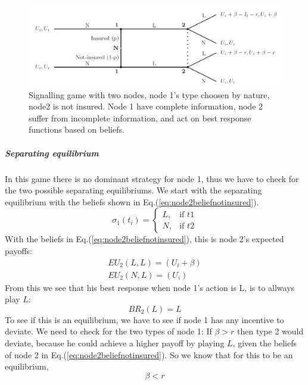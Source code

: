\begin{figure}[h]
\centering

  \centering
\includegraphics[width=1\linewidth]{../Figures/SignalingGameNotInsured.png}

\caption{Signalling game with two nodes, node 1's type choosen by nature, node2 is not insured. Node 1 have complete information, node 2 suffer from incomplete information, and act on best response functions based on beliefs. \label{fig:signalingNotInsured}}

\end{figure}
\subparagraph{Separating equilibrium}
In this game there is no dominant strategy for node 1, thus we have to check for the two possible separating equilibriums.
We start with the separating equilibrium with the beliefs shown in Eq.(\ref{eq:node2beliefnotinsured}).
\begin{equation}
    \sigma_{1}(t_{i})= 
\begin{cases}
   L,& \text{if } t1\\
   N,& \text{if } t2  
\end{cases}
\label{eq:node2beliefnotinsured}
\end{equation}
With the beliefs in Eq.(\ref{eq:node2beliefnotinsured}), this is node 2's expected payoffs:
\begin{eqnarray}
EU_{2}(L,L)=(U_{i}+\beta) \\
EU_{2}(N,L)=(U_{i})
\end{eqnarray}
From this we see that his best response when node 1's action is L, is to allways play $L$: \begin{equation}
BR_{2}(L)= L
\end{equation}
To see if this is an equilibrium, we have to see if node 1 has any incentive to deviate. 
We need to check for the two types of node 1:
If $\beta>r$ then type 2 would deviate, because he could achieve a higher payoff by playing $L$, given the beliefs of node 2 in Eq.(\ref{eq:node2beliefnotinsured}). So we know that for this to be an equilibrium, \begin{equation}
\beta < r
\label{eq:sepcondition}
\end{equation}  
